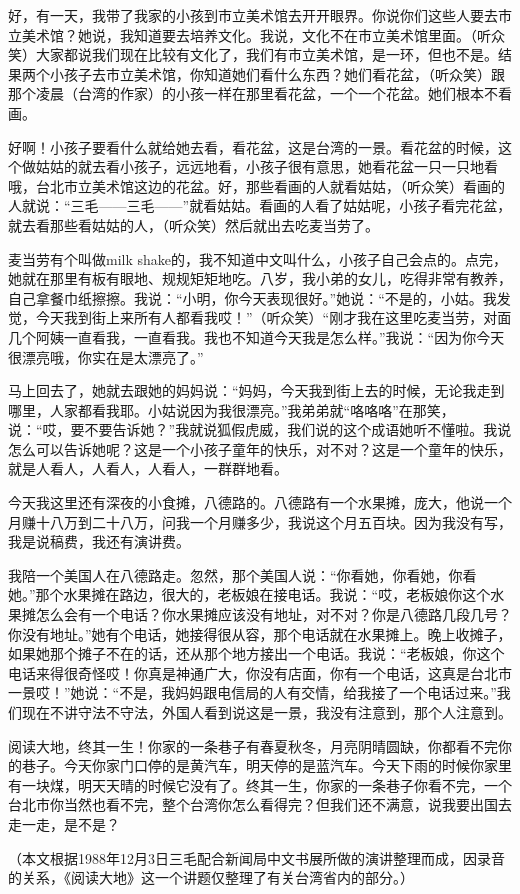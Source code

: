 \par 好，有一天，我带了我家的小孩到市立美术馆去开开眼界。你说你们这些人要去市立美术馆？她说，我知道要去培养文化。我说，文化不在市立美术馆里面。（听众笑）大家都说我们现在比较有文化了，我们有市立美术馆，是一环，但也不是。结果两个小孩子去市立美术馆，你知道她们看什么东西？她们看花盆，（听众笑）跟那个凌晨（台湾的作家）的小孩一样在那里看花盆，一个一个花盆。她们根本不看画。
\par 好啊！小孩子要看什么就给她去看，看花盆，这是台湾的一景。看花盆的时候，这个做姑姑的就去看小孩子，远远地看，小孩子很有意思，她看花盆一只一只地看哦，台北市立美术馆这边的花盆。好，那些看画的人就看姑姑，（听众笑）看画的人就说：“三毛——三毛——”就看姑姑。看画的人看了姑姑呢，小孩子看完花盆，就去看那些看姑姑的人，（听众笑）然后就出去吃麦当劳了。
\par 麦当劳有个叫做milk shake的，我不知道中文叫什么，小孩子自己会点的。点完，她就在那里有板有眼地、规规矩矩地吃。八岁，我小弟的女儿，吃得非常有教养，自己拿餐巾纸擦擦。我说：“小明，你今天表现很好。”她说：“不是的，小姑。我发觉，今天我到街上来所有人都看我哎！”（听众笑）“刚才我在这里吃麦当劳，对面几个阿姨一直看我，一直看我。我也不知道今天我是怎么样。”我说：“因为你今天很漂亮哦，你实在是太漂亮了。”
\par 马上回去了，她就去跟她的妈妈说：“妈妈，今天我到街上去的时候，无论我走到哪里，人家都看我耶。小姑说因为我很漂亮。”我弟弟就“咯咯咯”在那笑，说：“哎，要不要告诉她？”我就说狐假虎威，我们说的这个成语她听不懂啦。我说怎么可以告诉她呢？这是一个小孩子童年的快乐，对不对？这是一个童年的快乐，就是人看人，人看人，人看人，一群群地看。
\par 今天我这里还有深夜的小食摊，八德路的。八德路有一个水果摊，庞大，他说一个月赚十八万到二十八万，问我一个月赚多少，我说这个月五百块。因为我没有写，我是说稿费，我还有演讲费。
\par 我陪一个美国人在八德路走。忽然，那个美国人说：“你看她，你看她，你看她。”那个水果摊在路边，很大的，老板娘在接电话。我说：“哎，老板娘你这个水果摊怎么会有一个电话？你水果摊应该没有地址，对不对？你是八德路几段几号？你没有地址。”她有个电话，她接得很从容，那个电话就在水果摊上。晚上收摊子，如果她那个摊子不在的话，还从那个地方接出一个电话。我说：“老板娘，你这个电话来得很奇怪哎！你真是神通广大，你没有店面，你有一个电话，这真是台北市一景哎！”她说：“不是，我妈妈跟电信局的人有交情，给我接了一个电话过来。”我们现在不讲守法不守法，外国人看到说这是一景，我没有注意到，那个人注意到。
\par 阅读大地，终其一生！你家的一条巷子有春夏秋冬，月亮阴晴圆缺，你都看不完你的巷子。今天你家门口停的是黄汽车，明天停的是蓝汽车。今天下雨的时候你家里有一块煤，明天天晴的时候它没有了。终其一生，你家的一条巷子你看不完，一个台北市你当然也看不完，整个台湾你怎么看得完？但我们还不满意，说我要出国去走一走，是不是？
\par （本文根据1988年12月3日三毛配合新闻局中文书展所做的演讲整理而成，因录音的关系，《阅读大地》这一个讲题仅整理了有关台湾省内的部分。）



